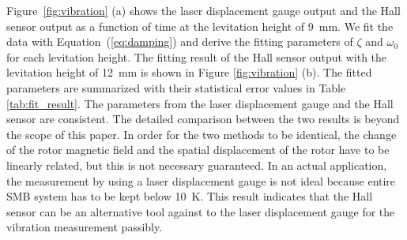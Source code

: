 \documentclass[a4paper,11pt]{jpconf}
\begin{document}
Figure~\ref{fig:vibration} (a) shows the laser displacement gauge output and the Hall sensor output as a function of time at the levitation height of 9~mm.
We fit the data with Equation~(\ref{eq:damping}) and derive the fitting parameters of $\zeta$ and $\omega_{0}$ for each levitation height.
The fitting result of the Hall sensor output with the levitation height of 12~mm is shown in Figure \ref{fig:vibration} (b).
The fitted parameters are summarized with their statistical error values in Table \ref{tab:fit_result}.
The parameters from the laser displacement gauge and the Hall sensor are consistent.
The detailed comparison between the two results is beyond the scope of this paper.
In order for the two methods to be identical, the change of the rotor magnetic field and the spatial displacement of the rotor have to be linearly related, but this is not necessary guaranteed.
In an actual application, the measurement by using a laser displacement gauge is not ideal because entire SMB system has to be kept below 10~K.
This result indicates that the Hall sensor can be an alternative tool against to the laser displacement gauge for the vibration measurement passibly.
\end{document}
